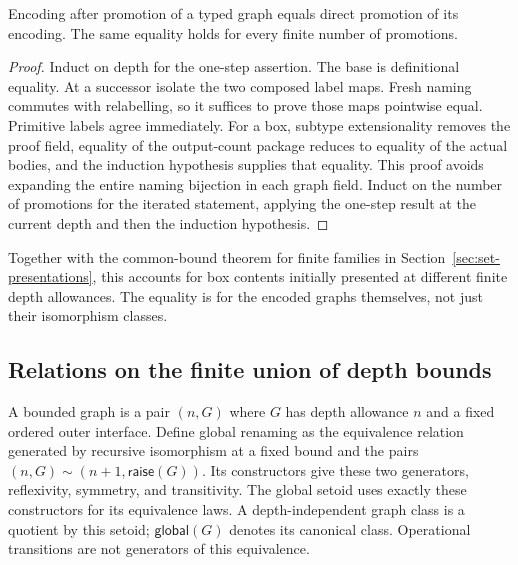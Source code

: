 
\begin{theorem}
Encoding after promotion of a typed graph equals direct promotion of its
encoding. The same equality holds for every finite number of promotions.
\end{theorem}
\begin{proof}
Induct on depth for the one-step assertion. The base is definitional equality.
At a successor isolate the two composed label maps. Fresh naming commutes with
relabelling, so it suffices to prove those maps pointwise equal. Primitive
labels agree immediately. For a box, subtype extensionality removes the proof
field, equality of the output-count package reduces to equality of the actual
bodies, and the induction hypothesis supplies that equality. This proof avoids
expanding the entire naming bijection in each graph field.
Induct on the number of promotions for the iterated statement, applying the
one-step result at the current depth and then the induction hypothesis.
\end{proof}
Together with the common-bound theorem for finite families in
Section~\ref{sec:set-presentations}, this accounts for box contents initially
presented at different finite depth allowances. The equality is for the encoded
graphs themselves, not just their isomorphism classes.

\subsection{Relations on the finite union of depth bounds}
\begin{definition}
A bounded graph is a pair $(n,G)$ where $G$ has depth allowance $n$ and a fixed
ordered outer interface. Define global renaming as the equivalence relation
generated by recursive isomorphism at a fixed bound and the pairs
$(n,G)\sim(n+1,\mathsf{raise}(G))$. Its constructors give these two generators,
reflexivity, symmetry, and transitivity. The global setoid uses exactly these
constructors for its equivalence laws. A depth-independent graph class is a
quotient by this setoid; $\mathsf{global}(G)$ denotes its canonical class.
Operational transitions are not generators of this equivalence.
\end{definition}

